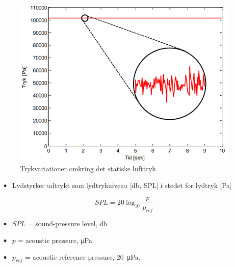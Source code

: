 \begin{figure} [H]
	\centering
	\includegraphics[width=.8\linewidth]{graphics/44.png}
	\caption{Trykvariationer omkring det statiske lufttryk.}
	\label{fig:44}
\end{figure}

\begin{itemize}
	\item Lydstyrker udtrykt som lydtrykniveau [\si{\decibel}, SPL] i stedet for lydtryk [\si{\pascal}]
\end{itemize}

\begin{equation}\label{eq:spl1}
SPL = 20\log_{10}\frac{p}{p_{ref}}
\end{equation}

\begin{itemize}
	\item $SPL$ = sound-pressure level, \si{\decibel}
	\item $p$ = acoustic pressure, \si{\micro\pascal}
	\item $p_{ref}$ = acoustic reference pressure, \SI{20}{\micro\pascal}.
\end{itemize}

